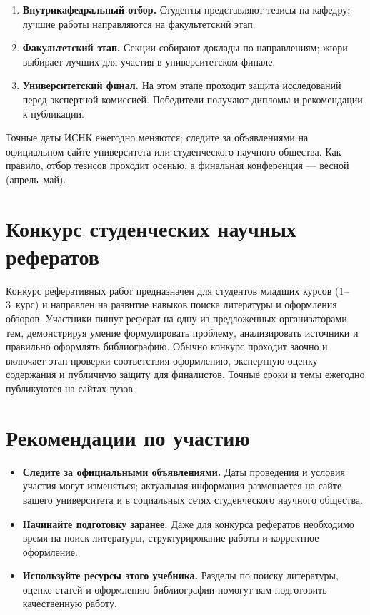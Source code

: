 \documentclass[
  russian,
  letterpaper,
]{book}
\providecommand{\tightlist}{%
  \setlength{\itemsep}{0pt}\setlength{\parskip}{0pt}}
\begin{document}
\begin{enumerate}
\def\labelenumi{\arabic{enumi}.}
\tightlist
\item
  \textbf{Внутрикафедральный отбор.} Студенты представляют тезисы на
  кафедру; лучшие работы направляются на факультетский этап.
\item
  \textbf{Факультетский этап.} Секции собирают доклады по направлениям;
  жюри выбирает лучших для участия в университетском финале.
\item
  \textbf{Университетский финал.} На этом этапе проходит защита
  исследований перед экспертной комиссией. Победители получают дипломы и
  рекомендации к публикации.
\end{enumerate}

Точные даты ИСНК ежегодно меняются; следите за объявлениями на
официальном сайте университета или студенческого научного общества. Как
правило, отбор тезисов проходит осенью, а финальная конференция ---
весной (апрель--май).

\section{Конкурс студенческих научных
рефератов}\label{ux43aux43eux43dux43aux443ux440ux441-ux441ux442ux443ux434ux435ux43dux447ux435ux441ux43aux438ux445-ux43dux430ux443ux447ux43dux44bux445-ux440ux435ux444ux435ux440ux430ux442ux43eux432}

Конкурс реферативных работ предназначен для студентов младших курсов
(1--3~курс) и направлен на развитие навыков поиска литературы и
оформления обзоров. Участники пишут реферат на одну из предложенных
организаторами тем, демонстрируя умение формулировать проблему,
анализировать источники и правильно оформлять библиографию. Обычно
конкурс проходит заочно и включает этап проверки соответствия
оформлению, экспертную оценку содержания и публичную защиту для
финалистов. Точные сроки и темы ежегодно публикуются на сайтах вузов.

\section{Рекомендации по
участию}\label{ux440ux435ux43aux43eux43cux435ux43dux434ux430ux446ux438ux438-ux43fux43e-ux443ux447ux430ux441ux442ux438ux44e}

\begin{itemize}
\tightlist
\item
  \textbf{Следите за официальными объявлениями.} Даты проведения и
  условия участия могут изменяться; актуальная информация размещается на
  сайте вашего университета и в социальных сетях студенческого научного
  общества.
\item
  \textbf{Начинайте подготовку заранее.} Даже для конкурса рефератов
  необходимо время на поиск литературы, структурирование работы и
  корректное оформление.
\item
  \textbf{Используйте ресурсы этого учебника.} Разделы по поиску
  литературы, оценке статей и оформлению библиографии помогут вам
  подготовить качественную работу.
\end{itemize}
\end{document}
